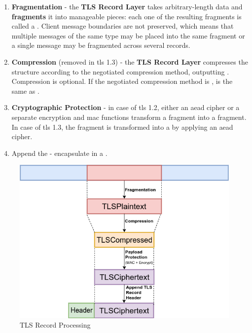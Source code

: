 \documentclass{llncs}
\begin{document}
\begin{enumerate}
  \item \textbf{Fragmentation} - the \textbf{TLS Record Layer} takes arbitrary-length data and \textbf{fragments}
  it into manageable pieces: each one of the resulting fragments is called a .
  Client message boundaries are not preserved, which means that multiple messages
  of the same type may be placed into the same fragment or a single message may
  be fragmented across several records.
  \item  \textbf{Compression} (removed in \gls{tls} 1.3) - the \textbf{TLS Record Layer} compresses the
   structure according to the negotiated compression method,
  outputting . Compression is optional. If the negotiated compression
  method is ,  is the same as .
  \item \textbf{Cryptographic Protection} - in case of \gls{tls} 1.2, either an
  \gls{aead} cipher or a separate encryption and \gls{mac} functions transform a
   fragment into a  fragment. In case
  of \gls{tls} 1.3, the  fragment is transformed into a 
  by applying an \gls{aead} cipher.
  \item Append the  - encapsulate 
  in a .
\end{enumerate}

\begin{figure}
  \caption{\label{fig:tls-record-processing}TLS Record Processing}
  \centering
  \includegraphics[width=1.0\textwidth]{img/tls-record-processing-3.png}
\end{figure}
\end{document}
